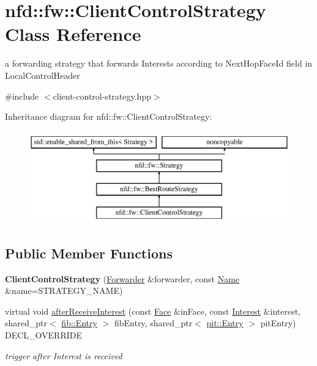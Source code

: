 \hypertarget{classnfd_1_1fw_1_1ClientControlStrategy}{}\section{nfd\+:\+:fw\+:\+:Client\+Control\+Strategy Class Reference}
\label{classnfd_1_1fw_1_1ClientControlStrategy}


a forwarding strategy that forwards Interests according to Next\+Hop\+Face\+Id field in Local\+Control\+Header  




{\ttfamily \#include $<$client-\/control-\/strategy.\+hpp$>$}

Inheritance diagram for nfd\+:\+:fw\+:\+:Client\+Control\+Strategy\+:\begin{figure}[H]
\begin{center}
\leavevmode
\includegraphics[height=4.000000cm]{classnfd_1_1fw_1_1ClientControlStrategy}
\end{center}
\end{figure}
\subsection*{Public Member Functions}
\begin{DoxyCompactItemize}
\item 
{\bfseries Client\+Control\+Strategy} (\hyperlink{classnfd_1_1Forwarder}{Forwarder} \&forwarder, const \hyperlink{classndn_1_1Name}{Name} \&name=S\+T\+R\+A\+T\+E\+G\+Y\+\_\+\+N\+A\+ME)\hypertarget{classnfd_1_1fw_1_1ClientControlStrategy_a0ae07e696d2750fb7ade939ccfe4a1b1}{}\label{classnfd_1_1fw_1_1ClientControlStrategy_a0ae07e696d2750fb7ade939ccfe4a1b1}

\item 
virtual void \hyperlink{classnfd_1_1fw_1_1ClientControlStrategy_ad1ed942efc1fb9d8578448888365f894}{after\+Receive\+Interest} (const \hyperlink{classnfd_1_1Face}{Face} \&in\+Face, const \hyperlink{classndn_1_1Interest}{Interest} \&interest, shared\+\_\+ptr$<$ \hyperlink{classnfd_1_1fib_1_1Entry}{fib\+::\+Entry} $>$ fib\+Entry, shared\+\_\+ptr$<$ \hyperlink{classnfd_1_1pit_1_1Entry}{pit\+::\+Entry} $>$ pit\+Entry) D\+E\+C\+L\+\_\+\+O\+V\+E\+R\+R\+I\+DE
\begin{DoxyCompactList}\small\item\em trigger after Interest is received \end{DoxyCompactList}\end{DoxyCompactItemize}
